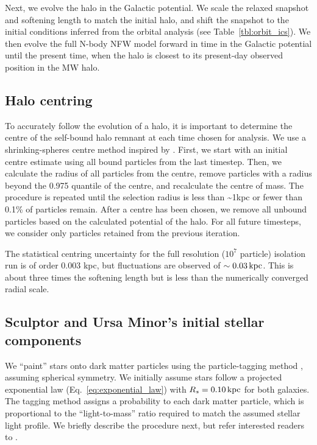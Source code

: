 Next, we evolve the halo in the Galactic potential. We scale the relaxed
snapshot and softening length to match the initial halo, and shift the
snapshot to the initial conditions inferred from the orbital analysis
(see Table~\ref{tbl:orbit_ics}). We then evolve the full N-body NFW
model forward in time in the Galactic potential until the present time,
when the halo is closest to its present-day observed position in the MW
halo.

\subsection{Halo centring}\label{sec:shrinking_spheres}

To accurately follow the evolution of a halo, it is important to
determine the centre of the self-bound halo remnant at each time chosen
for analysis. We use a shrinking-spheres centre method inspired by
\citet{power+2003}. First, we start with an initial centre estimate
using all bound particles from the last timestep. Then, we calculate the
radius of all particles from the centre, remove particles with a radius
beyond the 0.975 quantile of the centre, and recalculate the centre of
mass. The procedure is repeated until the selection radius is less than
\textasciitilde1kpc or fewer than 0.1\% of particles remain. After a
centre has been chosen, we remove all unbound particles based on the
\gadget{} calculated potential of the halo. For all future timesteps, we
consider only particles retained from the previous iteration.

The statistical centring uncertainty for the full resolution (\(10^7\)
particle) isolation run is of order 0.003 kpc, but fluctuations are
observed of \(\sim 0.03\,{\rm kpc}\). This is about three times the softening
length but is less than the numerically converged radial scale.

\subsection{Sculptor and Ursa Minor's initial stellar
components}\label{sec:painting_stars}

We ``paint'' stars onto dark matter particles using the particle-tagging
method \citep[e.g.,][]{bullock+johnston2005}, assuming spherical
symmetry. We initially assume stars follow a projected exponential law
(Eq.~\ref{eq:exponential_law}) with \(R_s = 0.10\,{\rm kpc}\) for both
galaxies. The tagging method assigns a probability to each dark matter
particle, which is proportional to the ``light-to-mass'' ratio required
to match the assumed stellar light profile. We briefly describe the
procedure next, but refer interested readers to \citet{EP2020}.

